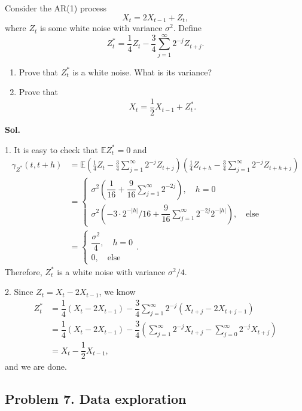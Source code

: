 \documentclass[lang=en,11pt,a4paper,citestyle =authoryear]{elegantpaper}
\begin{document}
Consider the AR(1) process
\[
X_t=2X_{t-1}+Z_t,
\]
where $Z_t$ is some white noise with variance $\sigma^2$. Define
\[
Z_t^*
=\frac{1}{4}Z_t
-\frac{3}{4}\sum_{j=1}^{\infty}2^{-j}Z_{t+j}.
\]
\begin{enumerate}[label=\arabic*.]
    \item
    Prove that $Z_t^*$ is a white noise. What is its variance?

    \item
    Prove that
    \[
    X_t=\frac{1}{2}X_{t-1}+Z_t^*.
    \]
\end{enumerate}
\vspace{0.5em}
\textbf{Sol.} \par
1. It is easy to check that $\mathbb{E}Z_t^* = 0$ and
\[
\begin{aligned}
    \gamma_{Z^*}(t,t+h) &= \mathbb{E}\left(\frac{1}{4}Z_t
-\frac{3}{4}\sum_{j=1}^{\infty}2^{-j}Z_{t+j}\right) \left(\frac{1}{4}Z_{t+h}
-\frac{3}{4}\sum_{j=1}^{\infty}2^{-j}Z_{t+h+j}\right) \\
&=\begin{cases}
    \sigma^2\left(\dfrac{1}{16} + \dfrac{9}{16}\sum\limits_{j=1}^{\infty} 2^{-2j}\right), \quad h = 0 \\
    \sigma^2\left(-3\cdot 2^{-|h|}/16 + \dfrac{9}{16} \sum\limits_{j=1}^{\infty}2^{-2j}2^{-|h|}\right),\quad\text{else}
\end{cases} \\
&=\begin{cases}
    \dfrac{\sigma^2}{4},\quad h=0 \\
    0,\quad\text{else}
\end{cases}.
\end{aligned}
\]
Therefore, $Z_t^*$ is a white noise with variance $\sigma^2/4$.\par
2. Since $Z_t = X_t- 2 X_{t-1}$, we know
\[
\begin{aligned}
    Z_t^* &= \dfrac{1}{4}(X_t- 2 X_{t-1}) - \dfrac{3}{4}\sum\limits_{j=1}^{\infty}2^{-j}(X_{t+j}- 2 X_{t+j-1}) \\
    &= \dfrac{1}{4}(X_t- 2 X_{t-1}) - \dfrac{3}{4}\left(\sum\limits_{j=1}^{\infty}2^{-j} X_{t+j} - \sum\limits_{j=0}^{\infty}2^{-j} X_{t+j}\right) \\
    & = X_t - \dfrac{1}{2}X_{t-1},
\end{aligned}
\]
and we are done.
\par 
\vspace{0.5em}

\subsection*{Problem 7. Data exploration}
\end{document}
